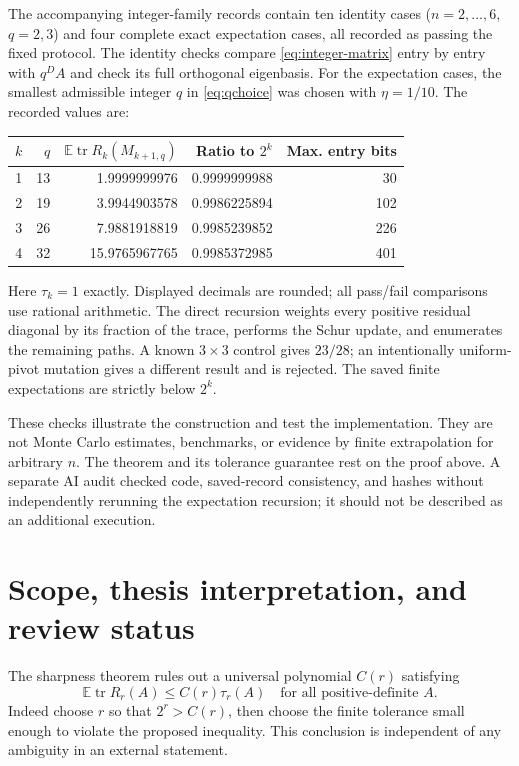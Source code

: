 \documentclass[10pt,letterpaper]{article}
\DeclareMathOperator{\tr}{tr}
\newcommand{\E}{\mathbb E}
\begin{document}
The accompanying integer-family records contain ten identity cases
($n=2,\ldots,6$, $q=2,3$) and four complete exact expectation cases,
all recorded as passing the fixed protocol. The identity checks compare
\eqref{eq:integer-matrix} entry by entry with $q^DA$ and check its full
orthogonal eigenbasis. For the expectation cases, the smallest admissible
integer $q$ in \eqref{eq:qchoice} was chosen with $\eta=1/10$.
The recorded values are:
\begin{center}
\begin{tabular}{rrrrr}
\toprule
$k$ & $q$ & $\E\tr R_k(M_{k+1,q})$ & Ratio to $2^k$ & Max. entry bits\\
\midrule
1 & 13 & 1.9999999976 & 0.9999999988 & 30\\
2 & 19 & 3.9944903578 & 0.9986225894 & 102\\
3 & 26 & 7.9881918819 & 0.9985239852 & 226\\
4 & 32 & 15.9765967765 & 0.9985372985 & 401\\
\bottomrule
\end{tabular}
\end{center}
Here $\tau_k=1$ exactly. Displayed decimals are rounded; all pass/fail
comparisons use rational arithmetic. The direct recursion weights every
positive residual diagonal by its fraction of the trace, performs the
Schur update, and enumerates the remaining paths. A known $3\times3$
control gives $23/28$; an intentionally uniform-pivot mutation gives a
different result and is rejected. The saved finite expectations are
strictly below $2^k$.

These checks illustrate the construction and test the implementation.
They are not Monte Carlo estimates, benchmarks, or evidence by finite
extrapolation for arbitrary $n$. The theorem and its tolerance guarantee
rest on the proof above. A separate AI audit checked code, saved-record
consistency, and hashes without independently rerunning the expectation
recursion; it should not be described as an additional execution.

\section{Scope, thesis interpretation, and review status}\label{sec:scope}

The sharpness theorem rules out a universal polynomial $C(r)$ satisfying
\begin{equation}\label{eq:poly-reading}
 \E\tr R_r(A)\leq C(r)\tau_r(A)
 \quad\text{for all positive-definite }A.
\end{equation}
Indeed choose $r$ so that $2^r>C(r)$, then choose the finite tolerance
small enough to violate the proposed inequality. This conclusion is
independent of any ambiguity in an external statement.
\end{document}
